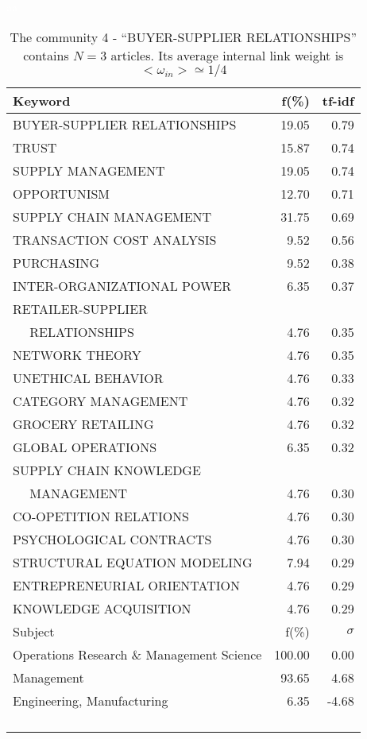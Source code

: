 \documentclass[a4paper,11pt]{report}
\begin{document}
\begin{landscape}
\begin{table}[!ht]
\caption{The community 4 - ``BUYER-SUPPLIER RELATIONSHIPS'' contains $N = 3$ articles. Its average internal link weight is $<\omega_{in}> \simeq 1/4$ }
\textcolor{white}{aa}\\
{\scriptsize\begin{tabular}{|l r  r|}
\hline
Keyword & f(\%) & tf-idf \\
\hline
BUYER-SUPPLIER RELATIONSHIPS & 19.05 & 0.79\\
TRUST & 15.87 & 0.74\\
SUPPLY MANAGEMENT & 19.05 & 0.74\\
OPPORTUNISM & 12.70 & 0.71\\
SUPPLY CHAIN MANAGEMENT & 31.75 & 0.69\\
TRANSACTION COST ANALYSIS & 9.52 & 0.56\\
PURCHASING & 9.52 & 0.38\\
INTER-ORGANIZATIONAL POWER & 6.35 & 0.37\\
RETAILER-SUPPLIER &  &\\
$\quad$ RELATIONSHIPS & 4.76 & 0.35\\
NETWORK THEORY & 4.76 & 0.35\\
UNETHICAL BEHAVIOR & 4.76 & 0.33\\
CATEGORY MANAGEMENT & 4.76 & 0.32\\
GROCERY RETAILING & 4.76 & 0.32\\
GLOBAL OPERATIONS & 6.35 & 0.32\\
SUPPLY CHAIN KNOWLEDGE &  &\\
$\quad$ MANAGEMENT & 4.76 & 0.30\\
CO-OPETITION RELATIONS & 4.76 & 0.30\\
PSYCHOLOGICAL CONTRACTS & 4.76 & 0.30\\
STRUCTURAL EQUATION MODELING & 7.94 & 0.29\\
ENTREPRENEURIAL ORIENTATION & 4.76 & 0.29\\
KNOWLEDGE ACQUISITION & 4.76 & 0.29\\
\hline
\hline
Subject & f(\%) & $\sigma$\\
\hline
Operations Research \& Management Science & 100.00 & 0.00\\
Management & 93.65 & 4.68\\
Engineering, Manufacturing & 6.35 & -4.68\\
 &  & \\
 &  & \\
 &  & \\
 &  & \\

\end{tabular}}
\end{table}
\end{landscape}
\end{document}
